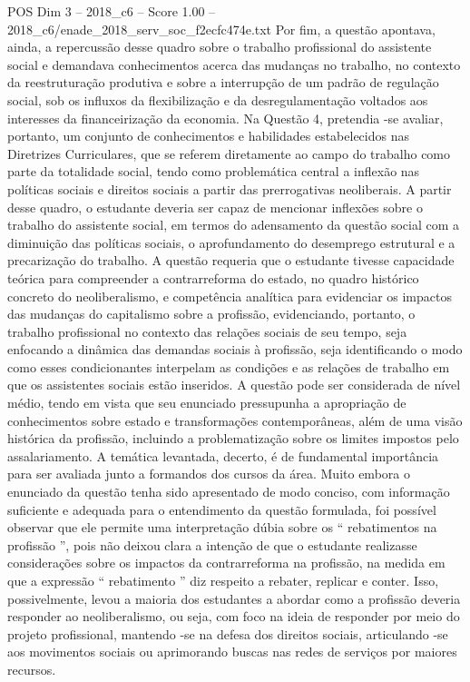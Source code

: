\begin{textsample}{POS Dim 3 – 2018\_c6 – Score 1.00 – 2018\_c6/enade\_2018\_serv\_soc\_f2ecfc474e.txt}
Por fim, a questão apontava, ainda, a repercussão desse quadro sobre o trabalho profissional do assistente social e demandava conhecimentos acerca das mudanças no trabalho, no contexto da reestruturação produtiva e sobre a interrupção de um padrão de regulação social, sob os influxos da flexibilização e da desregulamentação voltados aos interesses da financeirização da economia.
Na Questão 4, pretendia -se avaliar, portanto, um conjunto de conhecimentos e habilidades estabelecidos nas Diretrizes Curriculares, que se referem diretamente ao campo do trabalho como parte da totalidade social, tendo como problemática central a inflexão nas políticas sociais e direitos sociais a partir das prerrogativas neoliberais.
A partir desse quadro, o estudante deveria ser capaz de mencionar inflexões sobre o trabalho do assistente social, em termos do adensamento da questão social com a diminuição das políticas sociais, o aprofundamento do desemprego estrutural e a precarização do trabalho.
A questão requeria que o estudante tivesse capacidade teórica para compreender a contrarreforma do estado, no quadro histórico concreto do neoliberalismo, e competência analítica para evidenciar os impactos das mudanças do capitalismo sobre a profissão, evidenciando, portanto, o trabalho profissional no contexto das relações sociais de seu tempo, seja enfocando a dinâmica das demandas sociais à profissão, seja identificando o modo como esses condicionantes interpelam as condições e as relações de trabalho em que os assistentes sociais estão inseridos.
A questão pode ser considerada de nível médio, tendo em vista que seu enunciado pressupunha a apropriação de conhecimentos sobre estado e transformações contemporâneas, além de uma visão histórica da profissão, incluindo a problematização sobre os limites impostos pelo assalariamento.
A temática levantada, decerto, é de fundamental importância para ser avaliada junto a formandos dos cursos da área.
Muito embora o enunciado da questão tenha sido apresentado de modo conciso, com informação suficiente e adequada para o entendimento da questão formulada, foi possível observar que ele permite uma interpretação dúbia sobre os “ rebatimentos na profissão ”, pois não deixou clara a intenção de que o estudante realizasse considerações sobre os impactos da contrarreforma na profissão, na medida em que a expressão “ rebatimento ” diz respeito a rebater, replicar e conter.
Isso, possivelmente, levou a maioria dos estudantes a abordar como a profissão deveria responder ao neoliberalismo, ou seja, com foco na ideia de responder por meio do projeto profissional, mantendo -se na defesa dos direitos sociais, articulando -se aos movimentos sociais ou aprimorando buscas nas redes de serviços por maiores recursos.

\end{textsample}
